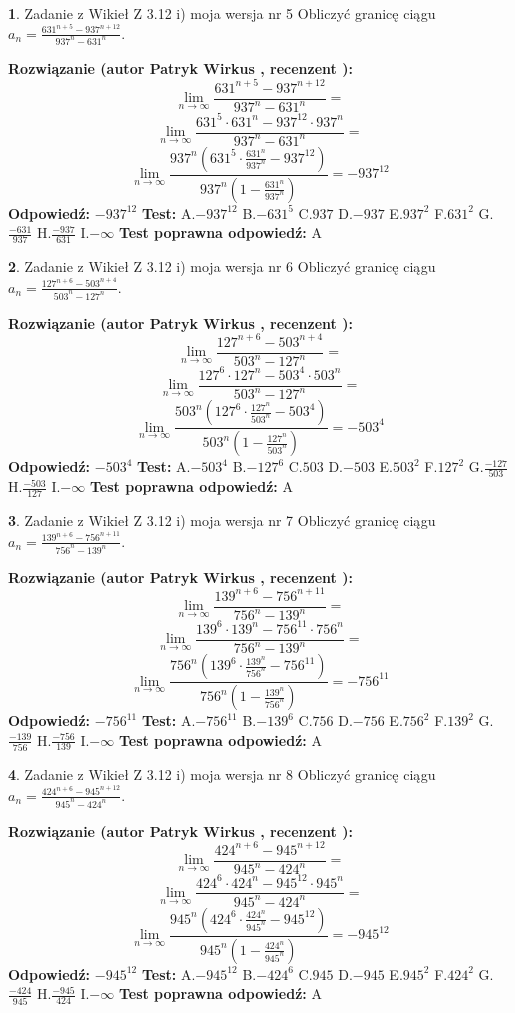 \documentclass[12pt, a4paper]{article}
\theoremstyle{definition} %
\newtheorem{zad}{}
\newcommand{\zadStart}[1]{\begin{zad}#1\newline}
\newcommand{\zadStop}{\end{zad}}
\newcommand{\rozwStart}[2]{\noindent \textbf{Rozwiązanie (autor #1 , recenzent #2): }\newline}
\newcommand{\rozwStop}{\newline}
\newcommand{\odpStart}{\noindent \textbf{Odpowiedź:}\newline}
\newcommand{\odpStop}{\newline}
\newcommand{\testStart}{\noindent \textbf{Test:}\newline}
\newcommand{\testStop}{\newline}
\newcommand{\kluczStart}{\noindent \textbf{Test poprawna odpowiedź:}\newline}
\newcommand{\kluczStop}{\newline}
\begin{document}
\zadStart{Zadanie z Wikieł Z 3.12 i) moja wersja nr 5}
Obliczyć granicę ciągu $a_{n}=\frac{631^{n+5} - 937^{n+12}}{937^{n}-631^{n}}$.
\zadStop
\rozwStart{Patryk Wirkus}{}
$$\lim\limits_{n\to\infty}\frac{631^{n+5} - 937^{n+12}}{937^{n}-631^{n}}=$$
$$\lim\limits_{n\to\infty}\frac{631^{5} \cdot 631^{n} - 937^{12} \cdot 937^{n}}{937^{n}-631^{n}}=$$
$$\lim\limits_{n\to\infty}\frac{937^{n}(631^{5} \cdot \frac{631^{n}}{937^{n}} - 937^{12})}{937^{n}(1-\frac{631^{n}}{937^{n}})} = -937^{12}$$
\rozwStop
\odpStart
$-937^{12}$
\odpStop
\testStart
A.$-937^{12}$
B.$-631^{5}$
C.$937$
D.$-937$
E.$937^{2}$
F.$631^{2}$
G.$\frac{-631}{937}$
H.$\frac{-937}{631}$
I.$-\infty$
\testStop
\kluczStart
A
\kluczStop



\zadStart{Zadanie z Wikieł Z 3.12 i) moja wersja nr 6}
Obliczyć granicę ciągu $a_{n}=\frac{127^{n+6} - 503^{n+4}}{503^{n}-127^{n}}$.
\zadStop
\rozwStart{Patryk Wirkus}{}
$$\lim\limits_{n\to\infty}\frac{127^{n+6} - 503^{n+4}}{503^{n}-127^{n}}=$$
$$\lim\limits_{n\to\infty}\frac{127^{6} \cdot 127^{n} - 503^{4} \cdot 503^{n}}{503^{n}-127^{n}}=$$
$$\lim\limits_{n\to\infty}\frac{503^{n}(127^{6} \cdot \frac{127^{n}}{503^{n}} - 503^{4})}{503^{n}(1-\frac{127^{n}}{503^{n}})} = -503^{4}$$
\rozwStop
\odpStart
$-503^{4}$
\odpStop
\testStart
A.$-503^{4}$
B.$-127^{6}$
C.$503$
D.$-503$
E.$503^{2}$
F.$127^{2}$
G.$\frac{-127}{503}$
H.$\frac{-503}{127}$
I.$-\infty$
\testStop
\kluczStart
A
\kluczStop



\zadStart{Zadanie z Wikieł Z 3.12 i) moja wersja nr 7}
Obliczyć granicę ciągu $a_{n}=\frac{139^{n+6} - 756^{n+11}}{756^{n}-139^{n}}$.
\zadStop
\rozwStart{Patryk Wirkus}{}
$$\lim\limits_{n\to\infty}\frac{139^{n+6} - 756^{n+11}}{756^{n}-139^{n}}=$$
$$\lim\limits_{n\to\infty}\frac{139^{6} \cdot 139^{n} - 756^{11} \cdot 756^{n}}{756^{n}-139^{n}}=$$
$$\lim\limits_{n\to\infty}\frac{756^{n}(139^{6} \cdot \frac{139^{n}}{756^{n}} - 756^{11})}{756^{n}(1-\frac{139^{n}}{756^{n}})} = -756^{11}$$
\rozwStop
\odpStart
$-756^{11}$
\odpStop
\testStart
A.$-756^{11}$
B.$-139^{6}$
C.$756$
D.$-756$
E.$756^{2}$
F.$139^{2}$
G.$\frac{-139}{756}$
H.$\frac{-756}{139}$
I.$-\infty$
\testStop
\kluczStart
A
\kluczStop



\zadStart{Zadanie z Wikieł Z 3.12 i) moja wersja nr 8}
Obliczyć granicę ciągu $a_{n}=\frac{424^{n+6} - 945^{n+12}}{945^{n}-424^{n}}$.
\zadStop
\rozwStart{Patryk Wirkus}{}
$$\lim\limits_{n\to\infty}\frac{424^{n+6} - 945^{n+12}}{945^{n}-424^{n}}=$$
$$\lim\limits_{n\to\infty}\frac{424^{6} \cdot 424^{n} - 945^{12} \cdot 945^{n}}{945^{n}-424^{n}}=$$
$$\lim\limits_{n\to\infty}\frac{945^{n}(424^{6} \cdot \frac{424^{n}}{945^{n}} - 945^{12})}{945^{n}(1-\frac{424^{n}}{945^{n}})} = -945^{12}$$
\rozwStop
\odpStart
$-945^{12}$
\odpStop
\testStart
A.$-945^{12}$
B.$-424^{6}$
C.$945$
D.$-945$
E.$945^{2}$
F.$424^{2}$
G.$\frac{-424}{945}$
H.$\frac{-945}{424}$
I.$-\infty$
\testStop
\kluczStart
A
\kluczStop
\end{document}
